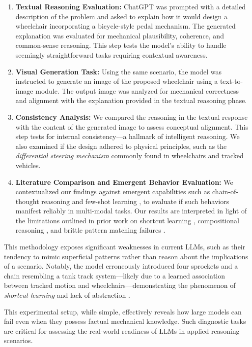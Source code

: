 \documentclass[11pt]{scrartcl}
\begin{document}
\begin{enumerate}
    \item \textbf{Textual Reasoning Evaluation:} ChatGPT was prompted with a detailed description of the problem and asked to explain how it would design a wheelchair incorporating a bicycle-style pedal mechanism. The generated explanation was evaluated for mechanical plausibility, coherence, and common-sense reasoning. This step tests the model’s ability to handle seemingly straightforward tasks requiring contextual awareness.

    \item \textbf{Visual Generation Task:} Using the same scenario, the model was instructed to generate an image of the proposed wheelchair using a text-to-image module. The output image was analyzed for mechanical correctness and alignment with the explanation provided in the textual reasoning phase.

    \item \textbf{Consistency Analysis:} We compared the reasoning in the textual response with the content of the generated image to assess conceptual alignment. This step tests for internal consistency—a hallmark of intelligent reasoning. We also examined if the design adhered to physical principles, such as the \textit{differential steering mechanism} commonly found in wheelchairs and tracked vehicles.

    \item \textbf{Literature Comparison and Emergent Behavior Evaluation:} We contextualized our findings against emergent capabilities such as chain-of-thought reasoning \cite{ref12} and few-shot learning \cite{ref11}, to evaluate if such behaviors manifest reliably in multi-modal tasks. Our results are interpreted in light of the limitations outlined in prior work on shortcut learning \cite{ref5}, compositional reasoning \cite{ref4}, and brittle pattern matching failures \cite{ref1, ref2}.
\end{enumerate}

This methodology exposes significant weaknesses in current LLMs, such as their tendency to mimic superficial patterns rather than reason about the implications of a scenario. Notably, the model erroneously introduced four sprockets and a chain resembling a tank track system—likely due to a learned association between tracked motion and wheelchairs—demonstrating the phenomenon of \textit{shortcut learning} and lack of abstraction \cite{ref5, ref3}.

This experimental setup, while simple, effectively reveals how large models can fail even when they possess factual mechanical knowledge. Such diagnostic tasks are critical for assessing the real-world readiness of LLMs in applied reasoning scenarios.
\end{document}
